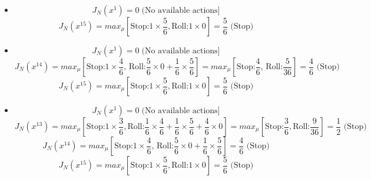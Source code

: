 \documentclass[11pt]{article}
\newenvironment{problem}[2][Problem]{\begin{trivlist}
\item[\hskip \labelsep {\bfseries #1}\hskip \labelsep {\bfseries #2.}]}{\end{trivlist}}
\begin{document}
\begin{problem}{4}
\begin{itemize}
	
	
		\item[Roll 7]
		\begin{equation}
			J_N(x^1) = 0 \; \text{(No available actions]}
		\end{equation}
		\begin{equation}
			J_N(x^{15}) = max_{\mu} \left[ \text{Stop:} 1 \times \frac{5}{6}, \text{Roll:} 1 \times 0 \right] = \frac{5}{6} \text{ (Stop)}
		\end{equation}
		
		
		
		\item[Roll 6]
		\begin{equation}
			J_N(x^1) = 0 \; \text{(No available actions]}
		\end{equation}
		\begin{equation}
			J_N(x^{14}) = max_{\mu} \left[ \text{Stop:} 1 \times \frac{4}{6} \text{, Roll:} \frac{5}{6} \times 0 + \frac{1}{6} \times \frac{5}{6}\right] = max_{\mu} \left[ \text{Stop:} \frac{4}{6} \text{, Roll:}\frac{5}{36}\right] =\frac{4}{6} \text{ (Stop)}
		\end{equation}
		\begin{equation}
			J_N(x^{15}) = max_{\mu} \left[ \text{Stop:} 1 \times \frac{5}{6}, \text{Roll:} 1 \times 0 \right] = \frac{5}{6} \text{ (Stop)}
		\end{equation}
		
		
		\item[Roll 5]	
		\begin{equation}
			J_N(x^1) = 0 \; \text{(No available actions]}
		\end{equation}
		\begin{equation}
			J_N(x^{13}) = max_{\mu} \left[ \text{Stop:} 1 \times \frac{3}{6}, \text{Roll:} \frac{1}{6} \times \frac{4}{6} + \frac{1}{6} \times \frac{5}{6} + \frac{4}{6} \times 0 \right] = max_{\mu} \left[ \text{Stop:} \frac{3}{6}, \text{Roll:} \frac{9}{36} \right] = \frac{1}{2} \text{ (Stop)}
		\end{equation}
		\begin{equation}
			J_N(x^{14}) = max_{\mu} \left[ \text{Stop:} 1 \times \frac{4}{6} \text{, Roll:} \frac{5}{6} \times 0 + \frac{1}{6} \times \frac{5}{6}\right] = \frac{4}{6} \text{ (Stop)}
		\end{equation}
		\begin{equation}
			J_N(x^{15}) = max_{\mu} \left[ \text{Stop:} 1 \times \frac{5}{6}, \text{Roll:} 1 \times 0 \right] = \frac{5}{6} \text{ (Stop)}
		\end{equation}
		

\end{itemize}
\end{problem}
\end{document}
